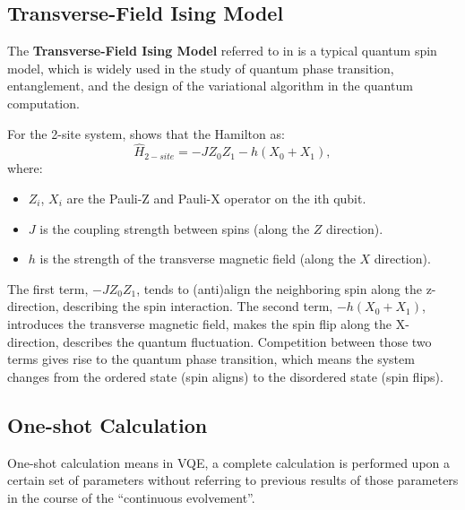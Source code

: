 \subsection{Transverse-Field Ising Model}
The \textbf{Transverse-Field Ising Model} referred to in \cite{UnbChemistry} is a typical quantum spin model, which is widely used in the study of quantum phase transition, entanglement, and the design of the variational algorithm in the quantum computation.

For the 2-site system, \cite{UnbChemistry} shows that the Hamilton as:
\begin{equation}
    \hat{H}_{2-site}=-JZ_0Z_1-h(X_0+X_1), 
\end{equation}
where:
\begin{itemize}
    \item $Z_i$, $X_i$ are the Pauli-Z and Pauli-X operator on the ith qubit.
    \item $J$ is the coupling strength between spins (along the $Z$ direction).
    \item $h$ is the strength of the transverse magnetic field (along the $X$ direction).
\end{itemize}
The first term, $-JZ_0Z_1$, tends to (anti)align the neighboring spin along the z-direction, describing the spin interaction. The second term, $-h(X_0+X_1)$, introduces the transverse magnetic field, makes the spin flip along the X-direction, describes the quantum fluctuation. Competition between those two terms gives rise to the quantum phase transition, which means the system changes from the ordered state (spin aligns) to the disordered state (spin flips).
\subsection{One-shot Calculation}
One-shot calculation means in VQE, a complete calculation is performed upon a certain set of parameters without referring to previous results of those parameters in the course of the ``continuous evolvement''.

